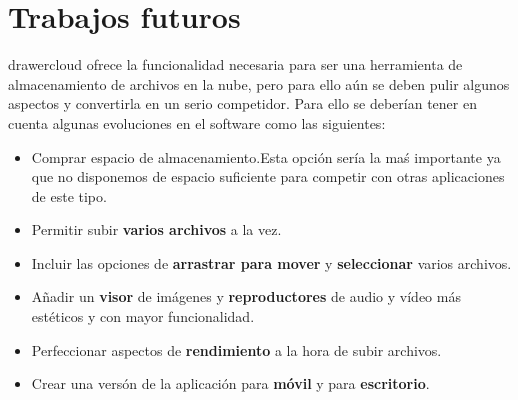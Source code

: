 \section{Trabajos futuros}
drawercloud ofrece la funcionalidad necesaria para ser una herramienta de almacenamiento de archivos en la nube, pero para ello aún se deben pulir algunos aspectos y convertirla en un serio competidor. Para ello se deberían tener en cuenta algunas evoluciones en el software como las siguientes:

\begin{itemize}
	\item Comprar espacio de almacenamiento.Esta opción sería la maś importante ya que no disponemos de espacio suficiente para competir con otras aplicaciones de este tipo.
	\item Permitir subir \textbf{varios archivos} a la vez.
	\item Incluir las opciones de \textbf{arrastrar para mover} y \textbf{seleccionar} varios archivos.
	\item Añadir un \textbf{visor} de imágenes y \textbf{reproductores} de audio y vídeo más estéticos y con mayor funcionalidad.
	\item Perfeccionar aspectos de \textbf{rendimiento}	a la hora de subir archivos.
	\item Crear una versón de la aplicación para \textbf{móvil} y para \textbf{escritorio}.
\end{itemize}
